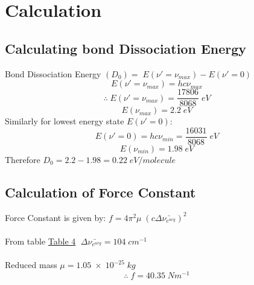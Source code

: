 \section{Calculation}

    \subsection{Calculating bond Dissociation Energy}
    Bond Dissociation Energy $(D_0)=\;E(\nu'=\nu_{max})-E(\nu'=0)$\\
    \[E(\nu'=\nu_{max})=hc\nu_{max}\]
    \[\therefore\;E(\nu'=\nu_{max})=\frac{17806}{8068}\;eV\]
    \[E(\nu_{max})=2.2\;eV\]
    Similarly for lowest energy state $E(\nu'=0)$:\\
    \[E(\nu'=0)=hc\nu_{min}=\frac{16031}{8068}\;eV\]
    \[E(\nu_{min})=1.98\;eV\]
    Therefore $D_0 = 2.2 - 1.98 = 0.22\;eV/molecule$\\

    \subsection{Calculation of Force Constant}
    \noindent Force Constant is given by: $f=4\pi^2 \mu\;(c\Delta\bar{\nu_{e^{avg}}})^2$\\\\
    From table \hyperref[tab:iodine]{Table 4} $\;\Delta\bar{\nu_{e^{avg}}} = 104\;cm^{-1}$\\\\
    Reduced mass $\mu= 1.05\; \times\; 10^{-25}\; kg $\\
    \[\therefore\;f=40.35\;N m^{-1}\]
